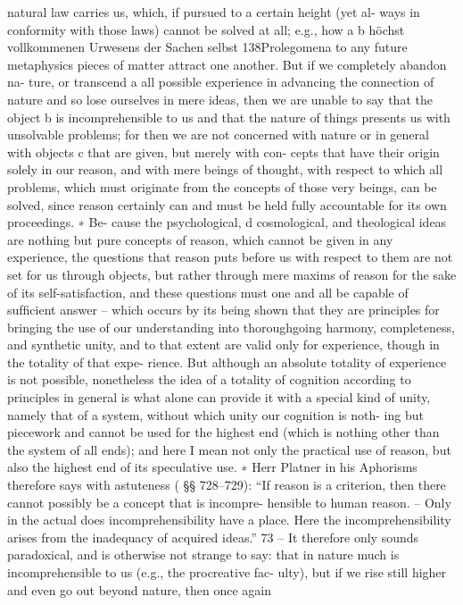 natural law carries us, which, if pursued to a certain height (yet al-
ways in conformity with those laws) cannot be solved at all; e.g., how
a
b
höchst vollkommenen Urwesens
der Sachen selbst
138Prolegomena to any future metaphysics
pieces of matter attract one another. But if we completely abandon na-
ture, or transcend a all possible experience in advancing the connection
of nature and so lose ourselves in mere ideas, then we are unable to say
that the object b is incomprehensible to us and that the nature of things
presents us with unsolvable problems; for then we are not concerned with
nature or in general with objects c that are given, but merely with con-
cepts that have their origin solely in our reason, and with mere beings of
thought, with respect to which all problems, which must originate from
the concepts of those very beings, can be solved, since reason certainly
can and must be held fully accountable for its own proceedings. ∗ Be-
cause the psychological, d cosmological, and theological ideas are nothing
but pure concepts of reason, which cannot be given in any experience,
the questions that reason puts before us with respect to them are not
set for us through objects, but rather through mere maxims of reason
for the sake of its self-satisfaction, and these questions must one and
all be capable of sufﬁcient answer – which occurs by its being shown
that they are principles for bringing the use of our understanding into
thoroughgoing harmony, completeness, and synthetic unity, and to that
extent are valid only for experience, though in the totality of that expe-
rience. But although an absolute totality of experience is not possible,
nonetheless the idea of a totality of cognition according to principles
in general is what alone can provide it with a special kind of unity,
namely that of a system, without which unity our cognition is noth-
ing but piecework and cannot be used for the highest end (which is
nothing other than the system of all ends); and here I mean not only
the practical use of reason, but also the highest end of its speculative
use.
∗ Herr Platner in his Aphorisms therefore says with astuteness ( §§ 728–729): “If
reason is a criterion, then there cannot possibly be a concept that is incompre-
hensible to human reason. – Only in the actual does incomprehensibility have
a place. Here the incomprehensibility arises from the inadequacy of acquired
ideas.” 73 – It therefore only sounds paradoxical, and is otherwise not strange
to say: that in nature much is incomprehensible to us (e.g., the procreative fac-
ulty), but if we rise still higher and even go out beyond nature, then once again
